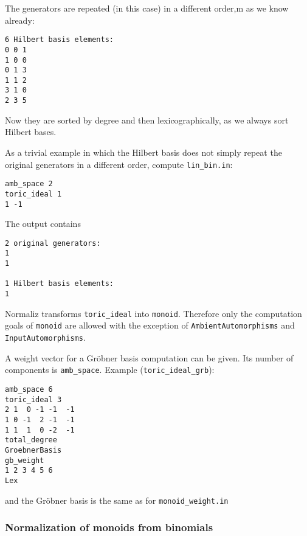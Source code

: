 The generators are repeated (in this case) in a different order,m as we know already:
\begin{Verbatim}
6 Hilbert basis elements:
0 0 1
1 0 0
0 1 3
1 1 2
3 1 0
2 3 5
\end{Verbatim}
Now they are sorted by degree and then lexicographically, as we always sort Hilbert bases.

As a trivial example in which the Hilbert basis does not simply repeat the original generators in a different order, compute \verb|lin_bin.in|:
\begin{Verbatim}
amb_space 2
toric_ideal 1
1 -1
\end{Verbatim}
The output contains
\begin{Verbatim}
2 original generators:
1
1

1 Hilbert basis elements:
1
\end{Verbatim}

Normaliz transforms \verb|toric_ideal| into \verb|monoid|. Therefore only the computation goals of \verb|monoid| are allowed with the exception of \verb|AmbientAutomorphisms| and \verb|InputAutomorphisms|.

A weight vector for a Gröbner basis computation can be given. Its number of components is \verb|amb_space|. Example (\verb|toric_ideal_grb|):
\begin{Verbatim}
amb_space 6
toric_ideal 3
2 1  0 -1 -1  -1
1 0 -1  2 -1  -1
1 1  1  0 -2  -1
total_degree
GroebnerBasis
gb_weight
1 2 3 4 5 6
Lex
\end{Verbatim}
and the Gröbner basis is the same as for \verb|monoid_weight.in|

\subsubsection{Normalization of monoids from binomials}\label{normal_toric_ideal}

